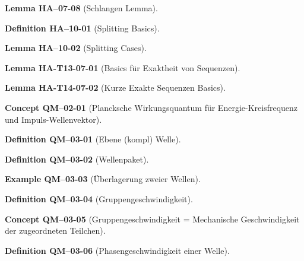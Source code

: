 \documentclass[10pt, letterpaper]{article}
\newcommand{\CustomHeading}[3]{%
  \par\medskip\noindent%
  \textbf{#1 #2} \textnormal{(#3)}.\enskip%
}
\newenvironment{DEF}[2]{\CustomHeading{Definition}{#1}{#2}}{}
\newenvironment{LEM}[2]{\CustomHeading{Lemma}{#1}{#2}}{}
\newenvironment{EXA}[2]{\CustomHeading{Example}{#1}{#2}}{}
\newenvironment{CONC}[2]{\CustomHeading{Concept}{#1}{#2}}{}
\begin{document}
\begin{LEM}{HA--07-08}{Schlangen Lemma}
\end{LEM}

\begin{DEF}{HA--10-01}{Splitting Basics}
\end{DEF}

\begin{LEM}{HA--10-02}{Splitting Cases}
\end{LEM}

\begin{LEM}{HA-T13-07-01}{Basics für Exaktheit von Sequenzen}
\end{LEM}

\begin{LEM}{HA-T14-07-02}{Kurze Exakte Sequenzen Basics}
\end{LEM}

\begin{CONC}{QM--02-01}{Plancksche Wirkungsquantum für Energie-Kreisfrequenz und Impuls-Wellenvektor}
\end{CONC}

\begin{DEF}{QM--03-01}{Ebene (kompl) Welle}
\end{DEF}

\begin{DEF}{QM--03-02}{Wellenpaket}
\end{DEF}

\begin{EXA}{QM--03-03}{Überlagerung zweier Wellen}
\end{EXA}

\begin{DEF}{QM--03-04}{Gruppengeschwindigkeit}
\end{DEF}

\begin{CONC}{QM--03-05}{Gruppengeschwindigkeit = Mechanische Geschwindigkeit der zugeordneten Teilchen}
\end{CONC}

\begin{DEF}{QM--03-06}{Phasengeschwindigkeit einer Welle}
\end{DEF}
\end{document}
